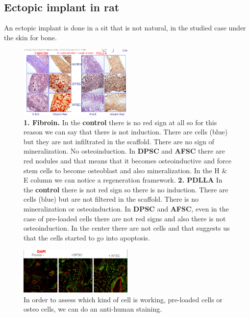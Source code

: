     \subsection{Ectopic implant in rat}
    An ectopic implant is done in a sit that is not natural, in the studied case under the skin for bone.

    \begin{figure}[H]
        \centering
        \includegraphics[width=0.5\textwidth]{implant_fibroin.png}
    \caption{\label{fig:implant_fibroin} \textbf{1. Fibroin.} In the \textbf{control} there is no red sign at all so for this reason we can say that there is not induction. There are cells (blue) but they are not infiltrated in the scaffold. There are no sign of mineralization. No osteoinduction. In \textbf{DPSC} and \textbf{AFSC} there are red nodules and that means that it becomes osteoinductive and force stem cells to become osteoblast and also mineralization. In the H $\&$ E column we can notice a regeneration framework. \textbf{2. PDLLA} In the \textbf{control} there is not red sign so there is no induction. There are cells (blue) but are not filtered in the scaffold. There is no mineralization or osteoinduction. In \textbf{DPSC} and \textbf{AFSC}, even in the case of pre-loaded cells there are not red signs and also there is not osteoinduction. In the center there are not cells and that suggests us that the cells started to go into apoptosis.}
    \end{figure}

    \begin{figure}[H]
        \centering
        \includegraphics[width=0.5\textwidth]{fibroin_confocal.png}
    \caption{\label{fig:fibroin_confocal} In order to assess which kind of cell is working, pre-loaded cells or osteo cells, we can do an anti-human staining.}
    \end{figure}

